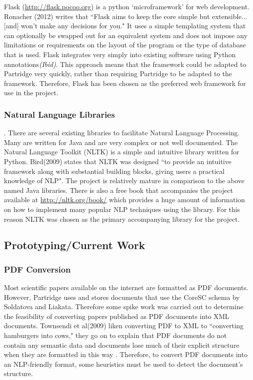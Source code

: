 \documentclass[12pt,a4paper]{article}
\begin{document}
Flask (\url{http://flask.pocoo.org}) is a python `microframework' for web
development. Ronacher (2012) writes that ``Flask aims to keep the core simple
but extensible...[and] won't make any decisions for you\cite{flask2012}." It
uses a simple templating system that can optionally be swapped out for an
equivalent system and does not impose any limitations or requirements on the
layout of the program or the type of database that is used. Flask integrates
very simply into existing software using Python annotations\emph{(Ibid)}. This approach
means that the framework could be adapted to Partridge very quickly, rather
than requiring Partridge to be adapted to the framework. Therefore, Flask has
been chosen as the preferred web framework for use in the project.

\subsubsection{Natural Language Libraries} \label{sec:libschoice}.  There are
several existing libraries to facilitate Natural Language Processing.  Many are
written for Java \cite{mallet2002}\cite{cunningham2011text} and are very
complex or not well documented. The Natural Language Toolkit (NLTK) is a simple
and intuitive library written for Python. Bird(2009) states that NLTK was
designed ``to provide an intuitive framework along with substantial building
blocks, giving users a practical knowledge of NLP\cite{bird2009natural}". The
project is relatively mature in comparison to the above named Java libraries.
There is also a free book that accompanies the project available at
\url{http://nltk.org/book/} which provides a huge amount of information on how
to implement many popular NLP techniques using the library. For this reason
NLTK was chosen as the primary accompanying library for the project.

\subsection{Prototyping/Current Work}

\subsubsection{PDF Conversion}
Most scientific papers available on the internet are formatted as PDF
documents. However, Partridge uses and stores documents that use the CoreSC
schema by Soldatova and Liakata\cite{liakata2008guidelines}. Therefore some
spike work was carried out to determine the feasibility of converting papers
published as PDF documents into XML documents. Townsendi et al(2009) liken converting
PDF to XML to ``converting hamburgers into cows," they go on to explain that
PDF documents do not contain any semantic data and documents lose much of their
explicit structure when they are formatted in this way \cite{Townsend2009}.
Therefore, to convert PDF documents into an NLP-friendly format, some
heuristics must be used to detect the document's structure. 
\end{document}
